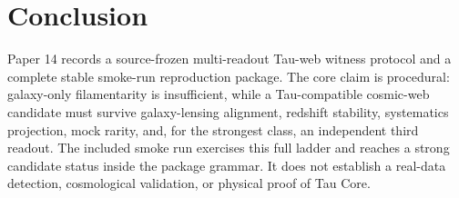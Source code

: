 \documentclass[11pt]{article}
\begin{document}
\section{Conclusion}

Paper 14 records a source-frozen multi-readout Tau-web witness protocol and a
complete stable smoke-run reproduction package.  The core claim is procedural:
galaxy-only filamentarity is insufficient, while a Tau-compatible cosmic-web
candidate must survive galaxy-lensing alignment, redshift stability,
systematics projection, mock rarity, and, for the strongest class, an
independent third readout.  The included smoke run exercises this full ladder
and reaches a strong candidate status inside the package grammar.  It does not
establish a real-data detection, cosmological validation, or physical proof of
Tau Core.



\end{document}
